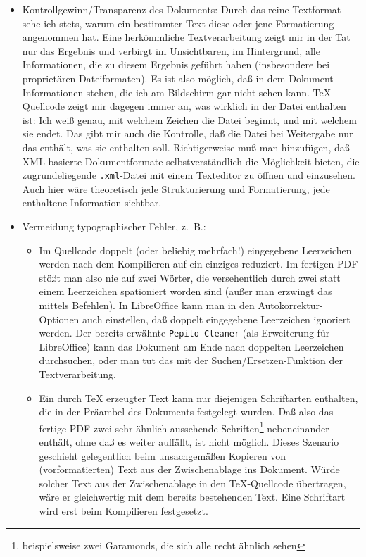\documentclass[11pt,a4paper,ngerman,DIV=8]{scrartcl}
\begin{document}
\begin{itemize}
  \item Kontrollgewinn/Transparenz des Dokuments: Durch das reine Textformat sehe ich stets, warum ein bestimmter Text diese oder jene Formatierung angenommen hat. Eine herkömmliche Textverarbeitung zeigt mir in der Tat nur das Ergebnis und verbirgt im Unsichtbaren, im Hintergrund, alle Informationen, die zu diesem Ergebnis geführt haben (insbesondere bei proprietären Dateiformaten). Es ist also möglich, daß in dem Dokument Informationen stehen, die ich am Bildschirm gar nicht sehen kann. \TeX{}-Quellcode zeigt mir dagegen immer an, was wirklich in der Datei enthalten ist: Ich weiß genau, mit welchem Zeichen die Datei beginnt, und mit welchem sie endet. Das gibt mir auch die Kontrolle, daß die Datei bei Weitergabe nur das enthält, was sie enthalten soll. Richtigerweise muß man hinzufügen, daß XML-basierte Dokumentformate selbstverständlich die Möglichkeit bieten, die zugrundeliegende \texttt{.xml}-Datei mit einem Texteditor zu öffnen und einzusehen. Auch hier wäre theoretisch jede Strukturierung und Formatierung, jede enthaltene Information sichtbar.
  \item Vermeidung typographischer Fehler, z.~B.:
  \begin{itemize}
    \item Im Quellcode doppelt (oder beliebig mehrfach!) eingegebene Leerzeichen werden nach dem Kompilieren auf ein einziges reduziert. Im fertigen PDF stößt man also nie auf zwei Wörter, die versehentlich durch zwei statt einem Leerzeichen spationiert worden sind (außer man erzwingt das mittels Befehlen). In LibreOffice kann man in den Autokorrektur-Optionen auch einstellen, daß doppelt eingegebene Leerzeichen ignoriert werden. Der bereits erwähnte \texttt{Pepito Cleaner} (als Erweiterung für LibreOffice) kann das Dokument am Ende nach doppelten Leerzeichen durchsuchen, oder man tut das mit der Suchen/Ersetzen-Funktion der Textverarbeitung.
    \item Ein durch \TeX{} erzeugter Text kann nur diejenigen Schriftarten enthalten, die in der Präambel des Dokuments festgelegt wurden. Daß also das fertige PDF zwei sehr ähnlich aussehende Schriften\footnote{beispielsweise zwei Garamonds, die sich alle recht ähnlich sehen} nebeneinander enthält, ohne daß es weiter auffällt, ist nicht möglich. Dieses Szenario geschieht gelegentlich beim unsachgemäßen Kopieren von (vorformatierten) Text aus der Zwischenablage ins Dokument. Würde solcher Text aus der Zwischenablage in den \TeX{}-Quellcode übertragen, wäre er gleichwertig mit dem bereits bestehenden Text. Eine Schriftart wird erst beim Kompilieren festgesetzt.

\end{itemize}
\end{itemize}
\end{document}
